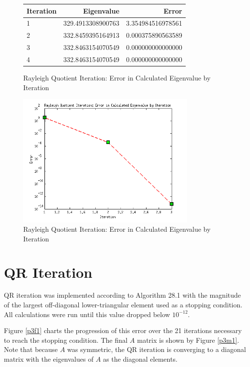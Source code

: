 \documentclass{article}
\begin{document}
\begin{figure}
\centering
\begin{tabular}{lrr}
\toprule
Iteration & Eigenvalue & Error \\
\midrule
 1 & 329.4913308900763 & 3.354984516978561 \\
 2 & 332.8459395164913 & 0.000375890563589 \\
 3 & 332.8463154070549 & 0.000000000000000 \\
 4 & 332.8463154070549 & 0.000000000000000 \\
\bottomrule
\end{tabular}
\caption{Rayleigh Quotient Iteration: Error in Calculated Eigenvalue by Iteration}
\label{p2t1}
\end{figure}

\begin{figure}
\centering
\includegraphics[width=0.8\textwidth]{Problem2Figure1.png}
\caption{Rayleigh Quotient Iteration: Error in Calculated Eigenvalue by Iteration}
\label{p2f1}
\end{figure}

\section{QR Iteration}\label{p3}

QR iteration was implemented according to Algorithm 28.1 with the magnitude of the largest off-diagonal lower-triangular element used as a stopping condition. All calculations were run until this value dropped below \(10^{-12}\).

Figure \ref{p3f1} charts the progression of this error over the 21 iterations necessary to reach the stopping condition. The final \(A\) matrix is shown by Figure \ref{p3m1}. Note that because \(A\) was symmetric, the QR iteration is converging to a diagonal matrix with the eigenvalues of \(A\) as the diagonal elements.
\end{document}

